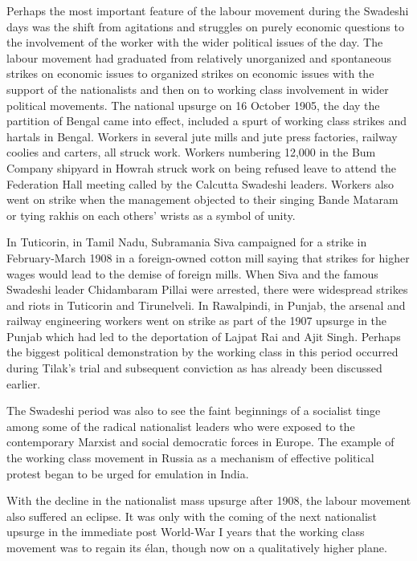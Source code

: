 Perhaps the most important feature of the labour movement during the Swadeshi days was the shift from agitations and struggles on purely economic questions to the involvement of the worker with the wider political issues of the day. The labour movement had graduated from relatively unorganized and spontaneous strikes on economic issues to organized strikes on economic issues with the support of the nationalists and then on to working class involvement in wider political movements. The national upsurge on 16 October 1905, the day the partition of Bengal came into effect, included a spurt of working class strikes and hartals in Bengal. Workers in several jute mills and jute press factories, railway coolies and carters, all struck work. Workers numbering 12,000 in the Bum Company shipyard in Howrah struck work on being refused leave to attend the Federation Hall meeting called by the Calcutta Swadeshi leaders. Workers also went on strike when the management objected to their singing Bande Mataram or tying rakhis on each others’ wrists as a symbol of unity.

In Tuticorin, in Tamil Nadu, Subramania Siva campaigned for a strike in February-March 1908 in a foreign-owned cotton mill saying that strikes for higher wages would lead to the demise of foreign mills. When Siva and the famous Swadeshi leader Chidambaram Pillai were arrested, there were widespread strikes and riots in Tuticorin and Tirunelveli. In Rawalpindi, in Punjab, the arsenal and railway engineering workers went on strike as part of the 1907 upsurge in the Punjab which had led to the deportation of Lajpat Rai and Ajit Singh. Perhaps the biggest political demonstration by the working class in this period occurred during Tilak’s trial and subsequent conviction as has already been discussed earlier.

The Swadeshi period was also to see the faint beginnings of a socialist tinge among some of the radical nationalist leaders who were exposed to the contemporary Marxist and social democratic forces in Europe. The example of the working class movement in Russia as a mechanism of effective political protest began to be urged for emulation in India.

With the decline in the nationalist mass upsurge after 1908, the labour movement also suffered an eclipse. It was only with the coming of the next nationalist upsurge in the immediate post World-War I years that the working class movement was to regain its élan, though now on a qualitatively higher plane.

